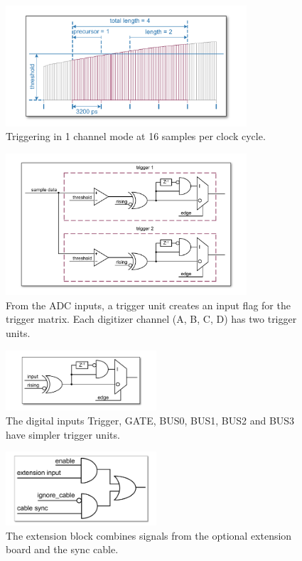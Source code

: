 \begin{figure}[ht]
    \centering
    \includegraphics[width=0.8\textwidth]{figures/1ChannelTriggering.pdf}
    \caption{Triggering in 1 channel mode at 16 samples per clock cycle.\label{fig:1ChannelTriggering}}
\end{figure}

\begin{figure}[hb]
    \centering
    \includegraphics[width=0.8\textwidth]{figures/analog-trigger.pdf}
    \caption{From the ADC inputs, a trigger unit creates an input flag for the trigger matrix. Each digitizer channel (A, B, C, D) has two trigger units.\label{fig:analog-trigger}}
\end{figure}

\begin{figure}[ht]
    \centering
    \includegraphics[width=0.5\textwidth]{figures/DigitalInput.pdf}
    \caption{The digital inputs Trigger, GATE, BUS0, BUS1, BUS2 and BUS3 have simpler trigger units.\label{fig:DigitalInput}}
\end{figure}
    
\begin{figure}
    \centering
    \includegraphics[width=0.5\textwidth]{figures/ExtensionBlock.pdf}
    \caption{\label{fig:ExtensionBlock} The extension block combines signals from the optional extension board and the sync cable.}
\end{figure}
    
